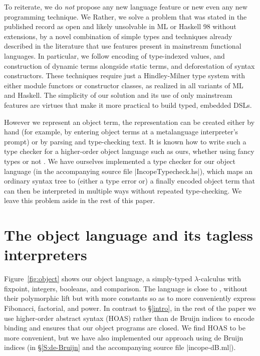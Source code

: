 To reiterate, we do \emph{not} propose any new language
feature or \ifshort new \else even any new programming \fi technique.
\ifshort
We
\else
Rather, we
\fi
solve a problem that was stated in the published record as open and
likely unsolvable in ML or Haskell 98 without extensions, by a novel
combination of simple types and techniques already described in the
literature that use features present in mainstream functional languages.
In particular, we follow  encoding of type-indexed
values,  and 
construction of dynamic terms alongside static terms, and
 deforestation of syntax
constructors.  These techniques require just
a Hindley-Milner type system with either module
functors or constructor classes, as realized in all variants of ML and
Haskell.
The simplicity of our solution and its
use of only mainstream features \ifshort\else are virtues that \fi make it more practical to build typed,
embedded DSLs.

\ifshort\else
However we represent an object term,
the representation can be created either by hand (for example, by
entering object terms at a metalanguage interpreter's prompt) or
by parsing and type-checking text.
It is known how to write such a type checker
for a higher-order object language such as ours,
whether using fancy types \citep{Guillemette-Monier-PLPV,WalidICFP02} or not \citep{baars-typing}.
We have ourselves implemented a type checker for our object
language (in the accompanying source file |IncopeTypecheck.hs|),
which maps an ordinary syntax tree to (either a type error or) a finally
encoded object term that can then be interpreted in multiple ways
without repeated type-checking.  We leave this problem aside in the
rest of this paper.
\fi

\section{The object language and its tagless interpreters}\label{language}

Figure~\ref{fig:object} shows our object language, a simply-typed
$\lambda$-calculus with fixpoint, integers, booleans, and comparison.
The language is close to , without their polymorphic
lift but with more constants so as to more conveniently express Fibonacci,
factorial, and power.
In contrast to \S\ref{intro}, in the rest of the paper 
we use higher-order
abstract syntax (HOAS) \citep{miller-manipulating,pfenning-higher-order}
rather than de Bruijn indices to encode binding and
ensures that our object programs are closed.
We find HOAS to be more convenient, but we have also implemented our
approach using de Bruijn indices
(in \S\ref{S:de-Bruijn} and the accompanying source file
|incope-dB.ml|).


